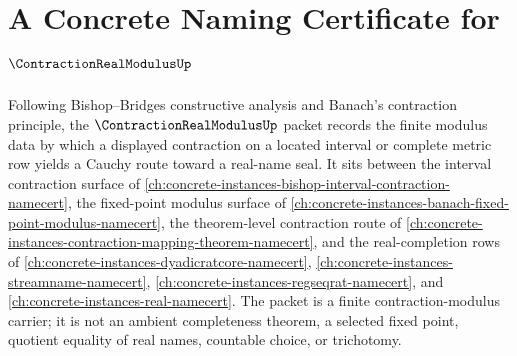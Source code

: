 \chapter{A Concrete Naming Certificate for $\ContractionRealModulusUp$}
\label{ch:concrete-instances-contraction-real-modulus-namecert}

Following Bishop--Bridges constructive analysis and Banach's contraction principle, the $\ContractionRealModulusUp$ packet records the finite modulus data by which a displayed contraction on a located interval or complete metric row yields a Cauchy route toward a real-name seal. It sits between the interval contraction surface of \autoref{ch:concrete-instances-bishop-interval-contraction-namecert}, the fixed-point modulus surface of \autoref{ch:concrete-instances-banach-fixed-point-modulus-namecert}, the theorem-level contraction route of \autoref{ch:concrete-instances-contraction-mapping-theorem-namecert}, and the real-completion rows of \autoref{ch:concrete-instances-dyadicratcore-namecert}, \autoref{ch:concrete-instances-streamname-namecert}, \autoref{ch:concrete-instances-regseqrat-namecert}, and \autoref{ch:concrete-instances-real-namecert}. The packet is a finite contraction-modulus carrier; it is not an ambient completeness theorem, a selected fixed point, quotient equality of real names, countable choice, or trichotomy.

